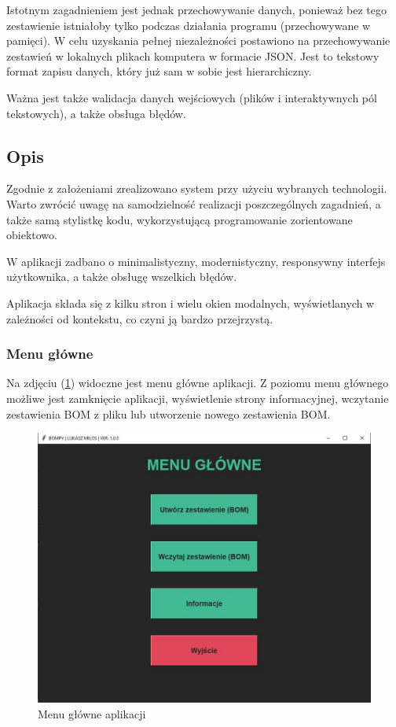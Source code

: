\documentclass[12pt,twoside]{article}
\begin{document}
Istotnym zagadnieniem jest jednak przechowywanie danych, ponieważ bez tego zestawienie istniałoby tylko podczas działania programu (przechowywane w pamięci). W celu uzyskania pełnej niezależności postawiono na przechowywanie zestawień w lokalnych plikach komputera w formacie JSON. Jest to tekstowy format zapisu danych, który już sam w sobie jest hierarchiczny.

Ważna jest także walidacja danych wejściowych (plików i interaktywnych pól tekstowych), a także obsługa błędów.

\subsection*{Opis}
Zgodnie z założeniami zrealizowano system przy użyciu wybranych technologii. Warto zwrócić uwagę na samodzielność realizacji poszczególnych zagadnień, a także samą stylistkę kodu, wykorzystującą programowanie zorientowane obiektowo.

W aplikacji zadbano o minimalistyczny, modernistyczny, responsywny interfejs użytkownika, a także obsługę wszelkich błędów.

Aplikacja składa się z kilku stron i wielu okien modalnych, wyświetlanych w zależności od kontekstu, co czyni ją bardzo przejrzystą.

\subsubsection*{Menu główne}
Na zdjęciu (\ref{fig:app:menu}) widoczne jest menu główne aplikacji. Z poziomu menu głównego możliwe jest zamknięcie aplikacji, wyświetlenie strony informacyjnej, wczytanie zestawienia BOM z pliku lub utworzenie nowego zestawienia BOM.

\begin{figure}[ht]
	\centering
	\includegraphics[width=\textwidth]{figures/app/menu.jpg}
	\caption{Menu główne aplikacji}
\label{fig:app:menu}
\end{figure}
\end{document}
